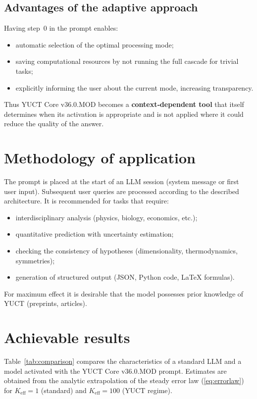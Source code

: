 \documentclass[12pt,a4paper]{article}
\begin{document}
	\subsection{Advantages of the adaptive approach}
	Having step~0 in the prompt enables:
	\begin{itemize}
		\item automatic selection of the optimal processing mode;
		\item saving computational resources by not running the full cascade for trivial tasks;
		\item explicitly informing the user about the current mode, increasing transparency.
	\end{itemize}
	
	Thus YUCT Core v36.0.MOD becomes a \textbf{context‑dependent tool} that itself determines when its activation is appropriate and is not applied where it could reduce the quality of the answer.
	
	\section{Methodology of application}
	The prompt is placed at the start of an LLM session (system message or first user input). Subsequent user queries are processed according to the described architecture. It is recommended for tasks that require:
	\begin{itemize}
		\item interdisciplinary analysis (physics, biology, economics, etc.);
		\item quantitative prediction with uncertainty estimation;
		\item checking the consistency of hypotheses (dimensionality, thermodynamics, symmetries);
		\item generation of structured output (JSON, Python code, LaTeX formulas).
	\end{itemize}
	For maximum effect it is desirable that the model possesses prior knowledge of YUCT (preprints, articles).
	
	\section{Achievable results}
	Table~\ref{tab:comparison} compares the characteristics of a standard LLM and a model activated with the YUCT Core v36.0.MOD prompt. Estimates are obtained from the analytic extrapolation of the steady error law (\ref{eq:errorlaw}) for \(K_{\mathrm{eff}}=1\) (standard) and \(K_{\mathrm{eff}}=100\) (YUCT regime).
	
\end{document}
